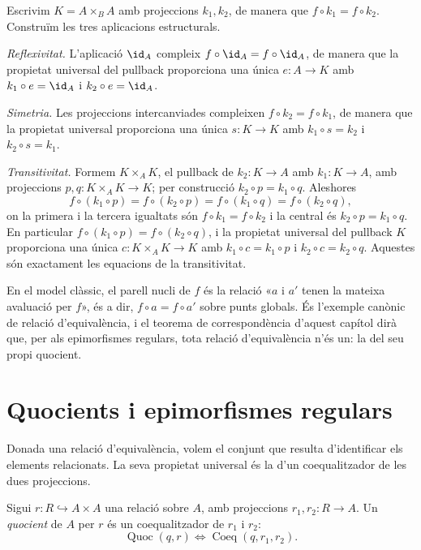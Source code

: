 \begin{prova}
Escrivim \(K=A\times_B A\) amb projeccions \(k_1,k_2\), de manera que \(f\circ k_1=f\circ k_2\). Construïm les tres aplicacions estructurals.

\emph{Reflexivitat.} L'aplicació \(\id_A\) compleix \(f\circ\id_A=f\circ\id_A\), de manera que la propietat universal del pullback proporciona una única \(e\colon A\to K\) amb \(k_1\circ e=\id_A\) i \(k_2\circ e=\id_A\).

\emph{Simetria.} Les projeccions intercanviades compleixen \(f\circ k_2=f\circ k_1\), de manera que la propietat universal proporciona una única \(s\colon K\to K\) amb \(k_1\circ s=k_2\) i \(k_2\circ s=k_1\).

\emph{Transitivitat.} Formem \(K\times_A K\), el pullback de \(k_2\colon K\to A\) amb \(k_1\colon K\to A\), amb projeccions \(p,q\colon K\times_A K\to K\); per construcció \(k_2\circ p=k_1\circ q\). Aleshores
\[
f\circ(k_1\circ p)=f\circ(k_2\circ p)=f\circ(k_1\circ q)=f\circ(k_2\circ q),
\]
on la primera i la tercera igualtats són \(f\circ k_1=f\circ k_2\) i la central és \(k_2\circ p=k_1\circ q\). En particular \(f\circ(k_1\circ p)=f\circ(k_2\circ q)\), i la propietat universal del pullback \(K\) proporciona una única \(c\colon K\times_A K\to K\) amb \(k_1\circ c=k_1\circ p\) i \(k_2\circ c=k_2\circ q\). Aquestes són exactament les equacions de la transitivitat.
\end{prova}

\begin{observacio}\label{obs:kernel-classica}
En el model clàssic, el parell nucli de \(f\) és la relació «\(a\) i \(a'\) tenen la mateixa avaluació per \(f\)», és a dir, \(f\circ a=f\circ a'\) sobre punts globals. És l'exemple canònic de relació d'equivalència, i el teorema de correspondència d'aquest capítol dirà que, per als epimorfismes regulars, tota relació d'equivalència n'és un: la del seu propi quocient.
\end{observacio}

\section{Quocients i epimorfismes regulars}\label{sec:quocients}

Donada una relació d'equivalència, volem el conjunt que resulta d'identificar els elements relacionats. La seva propietat universal és la d'un coequalitzador de les dues projeccions.

\begin{definicio}[Quocient]\label{def:quocient}
Sigui \(r\colon R\hookrightarrow A\times A\) una relació sobre \(A\), amb projeccions \(r_1,r_2\colon R\to A\). Un \emph{quocient} de \(A\) per \(r\) és un coequalitzador de \(r_1\) i \(r_2\):
\[
\operatorname{Quoc}(q,r)
\iff
\operatorname{Coeq}(q,r_1,r_2).
\]
\end{definicio}

